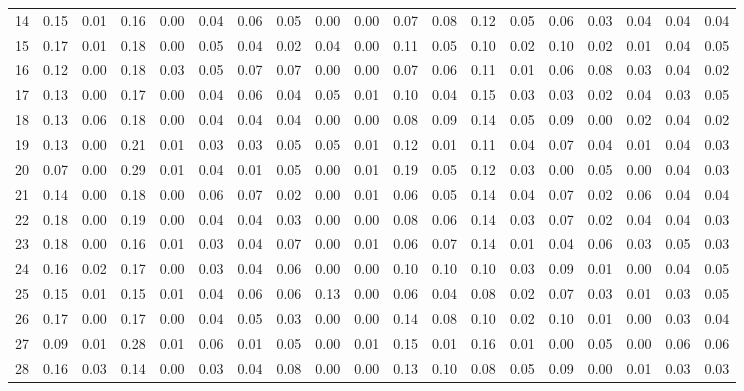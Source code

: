 \documentclass[a4paper]{article}
\begin{document}
\begin{sidewaystable}[h!]
{\begin{tabular}{rrrrrrrrrrrrrrrrrrr}
  14 & 0.15 & 0.01 & 0.16 & 0.00 & 0.04 & 0.06 & 0.05 & 0.00 & 0.00 & 0.07 & 0.08 & 0.12 & 0.05 & 0.06 & 0.03 & 0.04 & 0.04 & 0.04 \\ 
  15 & 0.17 & 0.01 & 0.18 & 0.00 & 0.05 & 0.04 & 0.02 & 0.04 & 0.00 & 0.11 & 0.05 & 0.10 & 0.02 & 0.10 & 0.02 & 0.01 & 0.04 & 0.05 \\ 
  16 & 0.12 & 0.00 & 0.18 & 0.03 & 0.05 & 0.07 & 0.07 & 0.00 & 0.00 & 0.07 & 0.06 & 0.11 & 0.01 & 0.06 & 0.08 & 0.03 & 0.04 & 0.02 \\ 
  17 & 0.13 & 0.00 & 0.17 & 0.00 & 0.04 & 0.06 & 0.04 & 0.05 & 0.01 & 0.10 & 0.04 & 0.15 & 0.03 & 0.03 & 0.02 & 0.04 & 0.03 & 0.05 \\ 
  18 & 0.13 & 0.06 & 0.18 & 0.00 & 0.04 & 0.04 & 0.04 & 0.00 & 0.00 & 0.08 & 0.09 & 0.14 & 0.05 & 0.09 & 0.00 & 0.02 & 0.04 & 0.02 \\ 
  19 & 0.13 & 0.00 & 0.21 & 0.01 & 0.03 & 0.03 & 0.05 & 0.05 & 0.01 & 0.12 & 0.01 & 0.11 & 0.04 & 0.07 & 0.04 & 0.01 & 0.04 & 0.03 \\ 
  20 & 0.07 & 0.00 & 0.29 & 0.01 & 0.04 & 0.01 & 0.05 & 0.00 & 0.01 & 0.19 & 0.05 & 0.12 & 0.03 & 0.00 & 0.05 & 0.00 & 0.04 & 0.03 \\ 
  21 & 0.14 & 0.00 & 0.18 & 0.00 & 0.06 & 0.07 & 0.02 & 0.00 & 0.01 & 0.06 & 0.05 & 0.14 & 0.04 & 0.07 & 0.02 & 0.06 & 0.04 & 0.04 \\ 
  22 & 0.18 & 0.00 & 0.19 & 0.00 & 0.04 & 0.04 & 0.03 & 0.00 & 0.00 & 0.08 & 0.06 & 0.14 & 0.03 & 0.07 & 0.02 & 0.04 & 0.04 & 0.03 \\ 
  23 & 0.18 & 0.00 & 0.16 & 0.01 & 0.03 & 0.04 & 0.07 & 0.00 & 0.01 & 0.06 & 0.07 & 0.14 & 0.01 & 0.04 & 0.06 & 0.03 & 0.05 & 0.03 \\ 
  24 & 0.16 & 0.02 & 0.17 & 0.00 & 0.03 & 0.04 & 0.06 & 0.00 & 0.00 & 0.10 & 0.10 & 0.10 & 0.03 & 0.09 & 0.01 & 0.00 & 0.04 & 0.05 \\ 
  25 & 0.15 & 0.01 & 0.15 & 0.01 & 0.04 & 0.06 & 0.06 & 0.13 & 0.00 & 0.06 & 0.04 & 0.08 & 0.02 & 0.07 & 0.03 & 0.01 & 0.03 & 0.05 \\ 
  26 & 0.17 & 0.00 & 0.17 & 0.00 & 0.04 & 0.05 & 0.03 & 0.00 & 0.00 & 0.14 & 0.08 & 0.10 & 0.02 & 0.10 & 0.01 & 0.00 & 0.03 & 0.04 \\ 
  27 & 0.09 & 0.01 & 0.28 & 0.01 & 0.06 & 0.01 & 0.05 & 0.00 & 0.01 & 0.15 & 0.01 & 0.16 & 0.01 & 0.00 & 0.05 & 0.00 & 0.06 & 0.06 \\ 
  28 & 0.16 & 0.03 & 0.14 & 0.00 & 0.03 & 0.04 & 0.08 & 0.00 & 0.00 & 0.13 & 0.10 & 0.08 & 0.05 & 0.09 & 0.00 & 0.01 & 0.03 & 0.03 \\ 

\end{tabular}}
\end{sidewaystable}
\end{document}

